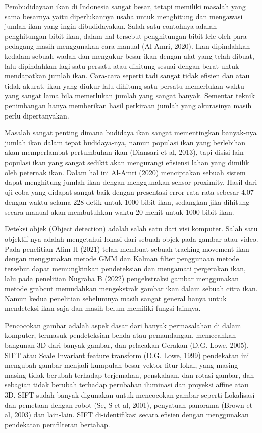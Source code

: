 Pembudidayaan ikan di Indonesia sangat besar, tetapi memiliki masalah yang sama besarnya yaitu diperlukannya usaha 
untuk menghitung dan mengawasi jumlah ikan yang ingin dibudidayakan. Salah satu contohnya adalah penghitungan bibit ikan, 
dalam hal tersebut penghitungan bibit lele oleh para pedagang masih menggunakan cara manual (Al-Amri, 2020). 
Ikan dipindahkan kedalam sebuah wadah dan mengukur besar ikan dengan alat yang telah dibuat, lalu dipindahkan lagi satu persatu 
atau dihitung sesuai dengan berat untuk mendapatkan jumlah ikan. Cara-cara seperti tadi sangat tidak efisien dan atau tidak akurat, 
ikan yang diukur lalu dihitung satu persatu memerlukan waktu yang sangat lama bila memerlukan jumlah yang sangat banyak. 
Sementar teknik penimbangan hanya memberikan hasil perkiraan jumlah yang akurasinya masih perlu dipertanyakan. 

Masalah sangat penting dimana budidaya ikan sangat mementingkan banyak-nya jumlah ikan dalam tepat budidaya-nya, 
namun populasi ikan yang berlebihan akan memperlambat pertumbuhan ikan (Diansari et al, 2013), 
tapi disisi lain populasi ikan yang sangat sedikit akan mengurangi efisiensi lahan yang dimilik oleh peternak ikan. 
Dalam hal ini Al-Amri (2020) menciptakan sebuah sistem dapat menghitung jumlah ikan dengan menggunakan sensor proximity. 
Hasil dari uji coba yang didapat sangat baik dengan presentasi error rata-rata sebesar 4,07 dengan waktu selama 228 detik untuk 1000 bibit ikan, 
sedangkan jika dihitung secara manual akan membutuhkan waktu 20 menit untuk 1000 bibit ikan. 

Deteksi objek (Object detection) adalah salah satu dari visi komputer. Salah satu objektif nya adalah mengetahui lokasi dari sebuah objek pada gambar atau video. 
Pada penelitian Alim H (2021) telah membuat sebuah tracking movement ikan dengan menggunakan metode GMM dan Kalman filter penggunaan metode tersebut dapat memungkinkan 
pendeteksian dan mengamati pergerakan ikan, lalu pada penelitian Nugraha B (2022) pengekstraksi gambar menggunakan metode grabcut memudahkan mengekstrak gambar ikan dalam sebuah citra ikan. 
Namun kedua penelitian sebelumnya masih sangat general hanya untuk mendeteksi ikan saja dan masih belum memiliki fungsi lainnya. 

Pencocokan gambar adalah aspek dasar dari banyak permasalahan di dalam komputer, termasuk  pendeteksian benda atau pemandangan, memecahkan bangunan 3D dari banyak gambar, 
dan pelacakan Gerakan (D.G. Lowe, 2005). SIFT atau Scale Invariant feature transform (D.G. Lowe, 1999) pendekatan ini mengubah gambar menjadi kumpulan besar vektor fitur lokal, 
yang masing-masing tidak berubah terhadap terjemahan, penskalaan, dan rotasi gambar, dan sebagian tidak berubah terhadap perubahan iluminasi 
dan proyeksi affine atau 3D. SIFT sudah banyak digunakan untuk mencocokan gambar seperti Lokalisasi dan pemetaan dengan robot (Se, S et al, 2001), penyatuan panorama (Brown et al, 2003) dan lain-lain. 
SIFT di-identifikasi secara efisien dengan menggunakan pendekatan pemfilteran bertahap. 

